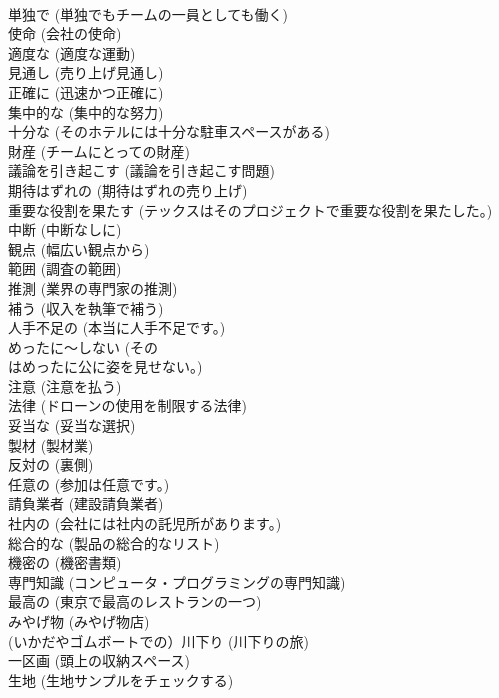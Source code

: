 \documentclass[8pt]{extreport}
\begin{document}
\begin{CJK}{UTF8}{min}
\\	単独で	(単独でもチームの一員としても働く)		
\\	使命	(会社の使命)		
\\	適度な	(適度な運動)		
\\	見通し	(売り上げ見通し)		
\\	正確に	(迅速かつ正確に)		
\\	集中的な	(集中的な努力)		
\\	十分な	(そのホテルには十分な駐車スペースがある)		
\\	財産	(チームにとっての財産)		
\\	議論を引き起こす	(議論を引き起こす問題)		
\\	期待はずれの	(期待はずれの売り上げ)		
\\	重要な役割を果たす	(テックスはそのプロジェクトで重要な役割を果たした。)		
\\	中断	(中断なしに)		
\\	観点	(幅広い観点から)		
\\	範囲	(調査の範囲)		
\\	推測	(業界の専門家の推測)		
\\	補う	(収入を執筆で補う)		
\\	人手不足の	(本当に人手不足です。)		
\\	めったに～しない	(その
\\	はめったに公に姿を見せない。)		
\\	注意	(注意を払う)		
\\	法律	(ドローンの使用を制限する法律)		
\\	妥当な	(妥当な選択)		
\\	製材	(製材業)		
\\	反対の	(裏側)		
\\	任意の	(参加は任意です。)		
\\	請負業者	(建設請負業者)		
\\	社内の	(会社には社内の託児所があります。)		
\\	総合的な	(製品の総合的なリスト)		
\\	機密の	(機密書類)		
\\	専門知識	(コンピュータ・プログラミングの専門知識)		
\\	最高の	(東京で最高のレストランの一つ)		
\\	みやげ物	(みやげ物店)		
\\	(いかだやゴムボートでの）川下り	(川下りの旅)		
\\	一区画	(頭上の収納スペース)		
\\	生地	(生地サンプルをチェックする)		

\end{CJK}
\end{document}
